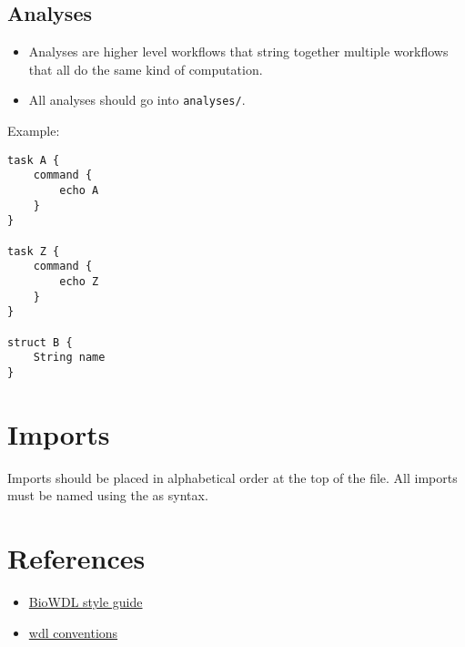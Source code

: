 \documentclass[
]{book}
\providecommand{\tightlist}{%
  \setlength{\itemsep}{0pt}\setlength{\parskip}{0pt}}
\begin{document}
\hypertarget{analyses}{%
\subsection{Analyses}\label{analyses}}

\begin{itemize}
\tightlist
\item
  Analyses are higher level workflows that string together multiple workflows
  that all do the same kind of computation.
\item
  All analyses should go into \texttt{analyses/}.
\end{itemize}

Example:

\begin{verbatim}
task A {
    command {
        echo A
    }
}

task Z {
    command {
        echo Z
    }
}

struct B {
    String name
}
\end{verbatim}

\hypertarget{imports-1}{%
\section{Imports}\label{imports-1}}

Imports should be placed in alphabetical order at the top of the file. All
imports must be named using the as syntax.

\hypertarget{references-2}{%
\section{References}\label{references-2}}

\begin{itemize}
\tightlist
\item
  \href{https://biowdl.github.io/styleGuidelines.html}{BioWDL style guide}
\item
  \href{https://github.com/mondrian-scwgs/mondrian/wiki/wdl_conventions}{wdl conventions}
\end{itemize}
\end{document}
